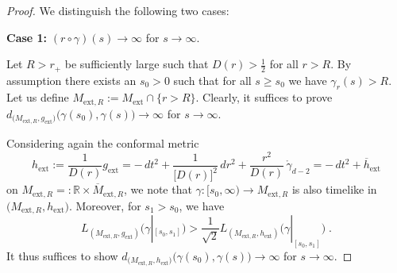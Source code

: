 \documentclass[reqno]{article}
\newcommand{\R}{\mathbb{R}}
\newcommand{\Mext}{M_{\mathrm{ext}}}
\newcommand{\gext}{g_{\mathrm{ext}}}
\begin{document}
\begin{proof}
We distinguish the following two cases:
\vspace*{2mm}

\textbf{Case 1:} $(r \circ \gamma)(s) \to \infty$ for $s \to \infty$.
\vspace*{2mm}

Let $R> r_+$ be sufficiently large such that $D(r) > \frac{1}{2}$ for all $r > R$. By assumption there exists an $s_0 > 0$ such that for all $s \geq s_0$ we have $\gamma_r(s) >R$. Let us define $M_{\mathrm{ext}, R} := \Mext \cap \{r>R\}$. Clearly, it suffices to prove $d_{\big(M_{\mathrm{ext},R}, \gext\big)}\big(\gamma(s_0), \gamma(s)\big) \to \infty$ for $s \to \infty$. 

Considering again the conformal metric
\begin{equation*}
h_{\mathrm{ext}} := \frac{1}{D(r)} \gext = -\, dt^2 + \frac{1}{\big[D(r)\big]^2} \, dr^2 +\frac{r^2}{D(r)} \, \mathring{\gamma}_{d-2} = -\, dt^2 + \overline{h}_{\mathrm{ext}}
\end{equation*}
on $M_{\mathrm{ext}, R} =: \R \times \overline{M}_{\mathrm{ext}, R}$, we note that $\gamma : [s_0, \infty) \to M_{\mathrm{ext}, R} $ is also timelike in $\big(M_{\mathrm{ext}, R} , h_{\mathrm{ext}}\big)$. Moreover, for $s_1 > s_0$, we have
\begin{equation*}
L_{(M_{\mathrm{ext}, R} , \gext)}\big(\gamma|_{[s_0, s_1]}\big) > \frac{1}{\sqrt{2}} L_{(M_{\mathrm{ext}, R} , h_{\mathrm{ext}})} \big(\gamma|_{[s_0, s_1]}\big) \;.
\end{equation*}
It thus suffices to show $d_{\big(M_{\mathrm{ext},R}, h_{\mathrm{ext}}\big)}\big(\gamma(s_0), \gamma(s)\big) \to \infty$ for $s \to \infty$.


\end{proof}
\end{document}
